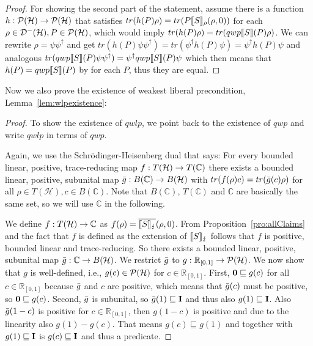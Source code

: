 \documentclass[a4paper,UKenglish,cleveref, autoref, thm-restate]{lipics-v2021}
\begin{document}
\begin{proof}
    For showing the second part of the statement, assume there is a function $h:\mathcal{P}(\mathcal{H}) \to \mathcal{P}(\mathcal{H})$ that satisfies $tr(h(P)\rho) = tr(P\llbracket S \rrbracket_{\rho}(\rho,0))$ for each $\rho \in \mathcal{D}^- (\mathcal{H}), P\in \mathcal{P}(\mathcal{H})$, which would imply $tr(h(P)\rho)=tr(qwp\llbracket S \rrbracket (P)\rho)$. We can rewrite $\rho=\psi \psi^\dagger$ and get $tr(h(P)\psi \psi^\dagger)=tr(\psi^\dagger h(P)\psi) = \psi^\dagger h(P)\psi$ and analogous $tr(qwp\llbracket S \rrbracket (P)\psi \psi^\dagger) = \psi^\dagger qwp\llbracket S \rrbracket (P)\psi$ which then means that $h(P)= qwp\llbracket S \rrbracket (P)$ by \cite[Chapter II, Proposition 2.15]{conway1994} for each $P$, thus they are equal.

\end{proof}

Now we also prove the existence of weakest liberal precondition, Lemma~\ref{lem:wlpexistence}:
\begin{proof}
    To show the existence of $qwlp$, we point back to the existence of $qwp$ and write $qwlp$ in terms of $qwp$.

    Again, we use the Schrödinger-Heisenberg dual \cite[Lemma 35 (ii), (iii), (vi)]{heisenbergdualityUnruh} that says: For every bounded linear, positive, trace-reducing map $f: T(\mathcal{H}) \to T(\mathbb{C})$ there exists a bounded linear, positive, subunital map $\Bar{g}:B(\mathbb{C}) \to B(\mathcal{H})$ with $tr(f(\rho) c) = tr(\Bar{g}(c)\rho)$ for all $\rho \in T(\mathcal{H}),c\in B(\mathbb{C})$.
    Note that $B(\mathbb{C})$, $T(\mathbb{C})$ and $\mathbb{C}$ are basically the same set, so we will use $\mathbb{C}$ in the following.

    We define $f:T(\mathcal{H}) \to \mathbb{C}$ as $f(\rho)=\overline{\llbracket S \rrbracket_{\lightning}}(\rho,0)$. From Proposition~\ref{pro:allClaims} and the fact that $f$ is defined as the extension of $\llbracket S \rrbracket_{\lightning}$ follows that $f$ is positive, bounded linear and trace-reducing. So there exists a bounded linear, positive, subunital map $\Bar{g}:\mathbb{C} \to B(\mathcal{H})$. We restrict $\Bar{g}$ to $g:\mathbb{R}_{[0,1]} \to \mathcal{P}(\mathcal{H})$. We now show that $g$ is well-defined, i.e., $g(c)\in \mathcal{P}(\mathcal{H})$ for $c \in \mathbb{R}_{[0,1]} $.
    First, $\mathbf{0} \sqsubseteq g(c)$ for all $c \in \mathbb{R}_{[0,1]} $ because $\Bar{g}$ and $c$ are positive, which means that $\Bar{g}(c)$ must be positive, so $\mathbf{0} \sqsubseteq g(c)$.
    Second, $\Bar{g}$ is subunital, so $\Bar{g}(1) \sqsubseteq \textbf{I}$ and thus also $g(1)\sqsubseteq \textbf{I}$. Also $\Bar{g}(1-c)$ is positive for $c\in \mathbb{R}_{[0,1]}$, then $g(1-c)$ is positive and due to the linearity also $g(1)-g(c)$. That means $g(c)\sqsubseteq g(1)$ and together with $g(1)\sqsubseteq \textbf{I}$ is $g(c) \sqsubseteq \textbf{I}$ and thus a predicate.




\end{proof}
\end{document}
